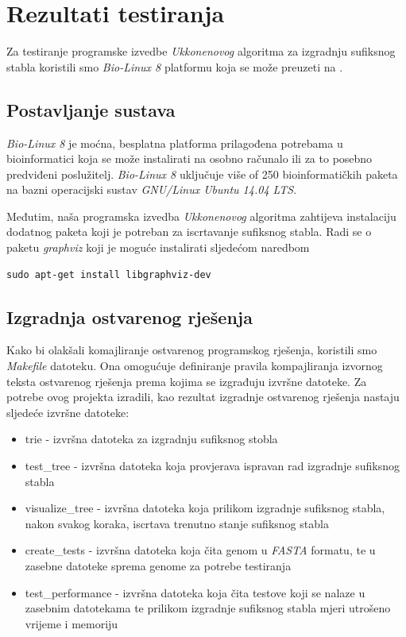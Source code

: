 \documentclass[times, utf8, seminar, numeric]{fer}
\begin{document}
\chapter{Rezultati testiranja}
	Za testiranje programske izvedbe \textit{Ukkonenovog} algoritma za izgradnju sufiksnog stabla koristili smo \textit{Bio-Linux 8} platformu koja se može preuzeti na \cite{biolinux}. 
	
\section{Postavljanje sustava}	
	\textit{Bio-Linux 8} je moćna, besplatna platforma prilagođena potrebama u bioinformatici koja se može instalirati na osobno računalo ili za to posebno predviđeni poslužitelj.  \textit{Bio-Linux 8} uključuje više of 250 bioinformatičkih paketa na bazni operacijski sustav \textit{GNU/Linux Ubuntu 14.04 LTS}.
	
	Međutim, naša programska izvedba \textit{Ukkonenovog} algoritma zahtijeva instalaciju dodatnog paketa koji je potreban za iscrtavanje sufiksnog stabla. Radi se o paketu \textit{graphviz} koji je moguće instalirati sljedećom naredbom
\begin{lstlisting}
sudo apt-get install libgraphviz-dev
\end{lstlisting}
	
\section{Izgradnja ostvarenog rješenja}
	Kako bi olakšali komajliranje ostvarenog programskog rješenja, koristili smo \textit{Makefile} datoteku. Ona omogućuje definiranje pravila kompajliranja izvornog teksta ostvarenog rješenja prema kojima se izgrađuju izvršne datoteke. Za potrebe ovog projekta izradili, kao rezultat izgradnje ostvarenog rješenja nastaju sljedeće izvršne datoteke:
\begin{itemize}
	\item trie - izvršna datoteka za izgradnju sufiksnog stobla
	\item test\_tree - izvršna datoteka koja provjerava ispravan rad izgradnje sufiksnog stabla
	\item visualize\_tree - izvršna datoteka koja prilikom izgradnje sufiksnog stabla, nakon svakog koraka, iscrtava trenutno stanje sufiksnog stabla
	\item create\_tests - izvršna datoteka koja čita genom u \textit{FASTA} formatu, te u zasebne datoteke sprema genome za potrebe testiranja
	\item test\_performance - izvršna datoteka koja čita testove koji se nalaze u zasebnim datotekama te prilikom izgradnje sufiksnog stabla mjeri utrošeno vrijeme i memoriju
\end{itemize}
\end{document}
